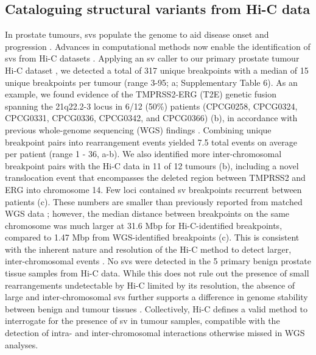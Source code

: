 \subsection{Cataloguing structural variants from Hi-C data}

In prostate tumours, \glspl{sv} populate the genome to aid disease onset and progression \cite{fraserGenomicHallmarksLocalized2017,quigleyGenomicHallmarksStructural2018}.
Advances in computational methods now enable the identification of \glspl{sv} from Hi-C datasets \cite{dixonIntegrativeDetectionAnalysis2018,hoStructuralVariationSequencing2019}.
Applying an \gls{sv} caller to our primary prostate tumour Hi-C dataset \cite{dixonIntegrativeDetectionAnalysis2018}, we detected a total of 317 unique breakpoints with a median of 15 unique breakpoints per tumour (range 3-95; a; Supplementary Table 6).
As an example, we found evidence of the TMPRSS2-ERG (T2E) genetic fusion spanning the 21q22.2-3 locus in 6/12 (50\%) patients (CPCG0258, CPCG0324, CPCG0331, CPCG0336, CPCG0342, and CPCG0366) (b), in accordance with previous whole-genome sequencing (WGS) findings \cite{fraserGenomicHallmarksLocalized2017}.
Combining unique breakpoint pairs into rearrangement events yielded 7.5 total events on average per patient (range 1 - 36, a-b).
We also identified more inter-chromosomal breakpoint pairs with the Hi-C data in 11 of 12 tumours (b), including a novel translocation event that encompasses the deleted region between TMPRSS2 and ERG into chromosome 14.
Few loci contained \gls{sv} breakpoints recurrent between patients (c).
These numbers are smaller than previously reported from matched WGS data \cite{fraserGenomicHallmarksLocalized2017}; however, the median distance between breakpoints on the same chromosome was much larger at 31.6 Mbp for Hi-C-identified breakpoints, compared to 1.47 Mbp from WGS-identified breakpoints (c).
This is consistent with the inherent nature and resolution of the Hi-C method to detect larger, inter-chromosomal events \cite{dixonIntegrativeDetectionAnalysis2018}.
No \glspl{sv} were detected in the 5 primary benign prostate tissue samples from Hi-C data.
While this does not rule out the presence of small rearrangements undetectable by Hi-C limited by its resolution, the absence of large and inter-chromosomal \glspl{sv} further supports a difference in genome stability between benign and tumour tissues \cite{fraserGenomicHallmarksLocalized2017,bergerGenomicComplexityPrimary2011,bacaPunctuatedEvolutionProstate2013,mazrooeiCistromePartitioningReveals2019}.
Collectively, Hi-C defines a valid method to interrogate for the presence of \gls{sv} in tumour samples, compatible with the detection of intra- and inter-chromosomal interactions otherwise missed in WGS analyses.

